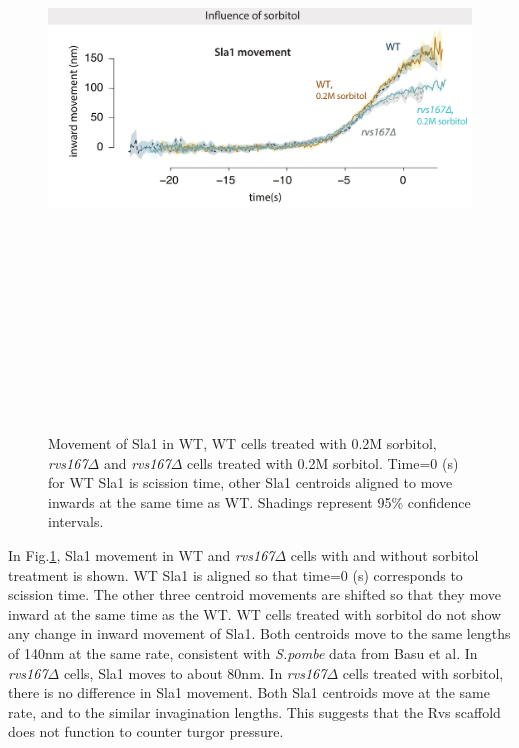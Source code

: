 	\vspace{2mm}
		\begin{figure}[H]
			\hspace{-0.5cm}
		\centering
		\includegraphics[width=15cm,height=17cm,keepaspectratio]{figures/results_final/sorbitol2}
		\caption[Effect of sorbitol on \textit{rvs167$\Delta$} cells]
		{Movement of Sla1 in WT, WT cells treated with 0.2M sorbitol, \textit{rvs167$\Delta$} and \textit{rvs167$\Delta$} cells treated with 0.2M sorbitol. Time=0 (s) for WT Sla1 is scission time, other Sla1 centroids aligned to move inwards at the same time as WT. Shadings represent 95\% confidence intervals.
			\label{fig_sorbitol}}
		
	\end{figure}

In Fig.\ref{fig_sorbitol}, Sla1 movement in WT and \textit{rvs167$\Delta$} cells with and without sorbitol treatment is shown. WT Sla1 is aligned so that time=0 (s) corresponds to scission time. The other three centroid movements are shifted so that they move inward at the same time as the WT. WT cells treated with sorbitol do not show any change in inward movement of Sla1. Both centroids move to the same lengths of 140nm at the same rate, consistent with \textit{S.pombe} data from Basu et al. In \textit{rvs167$\Delta$} cells, Sla1 moves to about 80nm. In \textit{rvs167$\Delta$} cells treated with sorbitol, there is no difference in Sla1 movement. Both Sla1 centroids move at the same rate, and to the similar invagination lengths. This suggests that the Rvs scaffold does not function to counter turgor pressure.  



